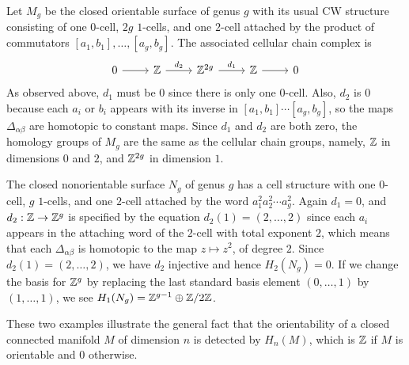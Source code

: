 \begin{example}
Let $M_g$ be the closed orientable surface of genus $g$ with its usual CW
structure consisting of one $0$-cell, $2g$ $1$-cells, and one $2$-cell attached by the product of commutators $[a_1,b_1],\dots,[a_g,b_g]$. The associated cellular chain complex is
\[\begin{tikzcd}
0\ar[r]&\Z\ar[r,"d_2"]&\Z^{2g}\ar[r,"d_1"]&\Z\ar[r]&0
\end{tikzcd}\]
As observed above, $d_1$ must be $0$ since there is only one $0$-cell. Also, $d_2$ is $0$ because each $a_i$ or $b_i$ appears with its inverse in $[a_1,b_1]\cdots[a_g,b_g]$, so the maps $\Delta_{\alpha\beta}$ are
homotopic to constant maps. Since $d_1$ and $d_2$ are both zero, the homology groups of $M_g$ are the same as the cellular chain groups, namely, $\mathbb{Z}$ in dimensions $0$ and $2$, and $\mathbb{Z}^{2g}$ in dimension $1$.
\end{example}
\begin{example}
The closed nonorientable surface $N_g$ of genus $g$ has a cell structure
with one $0$-cell, $g$ $1$-cells, and one $2$-cell attached by the word $a^2_1a^2_2\cdots a^2_g$. Again $d_1=0$, and $d_2:\mathbb{Z}\to\mathbb{Z}^g$ is specified by the equation $d_2(1)=(2,\dots,2)$ since each $a_i$ appears in the attaching word of the $2$-cell with total exponent $2$, which means that
each $\Delta_{\alpha\beta}$ is homotopic to the map $z\mapsto z^2$, of degree $2$. Since $d_2(1)=(2,\dots,2)$, we have $d_2$ injective and hence $H_2(N_g)=0$. If we change the basis for $\mathbb{Z}^g$ by replacing
the last standard basis element $(0,\dots,1)$ by $(1,\dots,1)$, we see $H_1(N_g)=\mathbb{Z}^{g-1}\oplus\mathbb{Z}/2\mathbb{Z}$.
\end{example}
These two examples illustrate the general fact that the orientability of a closed connected manifold $M$ of dimension $n$ is detected by $H_n(M)$, which is $\mathbb{Z}$ if $M$ is orientable and $0$ otherwise.

